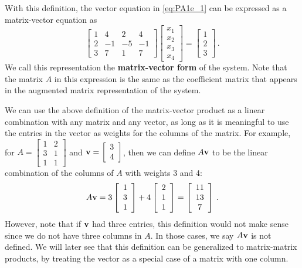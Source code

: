 With this definition, the vector equation in \eqref{eq:PA1e_1} can be expressed as a matrix-vector equation as
\[\left[ \begin{array}{crrr} 1&4&2&4 \\ 2&-1&-5&-1 \\ 3&7&1&7 \end{array} \right] \left[ \begin{array}{c} x_1 \\x_2 \\x_3\\x_4 \end{array} \right] = \left[ \begin{array}{c} 1\\2\\3 \end{array} \right] \,.\]
We call this representation the \textbf{matrix-vector form} of the system. Note that the matrix $A$ in this expression is the same as the coefficient matrix that appears in the augmented matrix representation of the system.

We can use the above definition of the matrix-vector product as a linear combination with any matrix and any vector, as long as it is meaningful to use the entries in the vector as weights for the columns of the matrix. For example, for $A=\left[ \begin{array}{cc} 1&2\\3&1\\1&1 \end{array} \right]$ and $\mathbf{v} = \left[ \begin{array}{c} 3\\4 \end{array} \right]$, then we can define $A\mathbf{v}$ to be the linear combination of the columns of $A$ with weights 3 and 4:
\[A\mathbf{v}= 3 \left[ \begin{array}{c} 1\\3\\1 \end{array} \right] + 4 \left[ \begin{array}{c} 2\\1\\1 \end{array} \right] = \left[ \begin{array}{c} 11\\13\\7 \end{array} \right] \, .\]
However, note that if $\mathbf{v}$ had three entries, this definition would not make sense since we do not have three columns in $A$. In those cases, we say $A\mathbf{v}$ is not defined. We will later see that this definition can be generalized to matrix-matrix products, by treating the vector as a special case of a matrix with one column.

